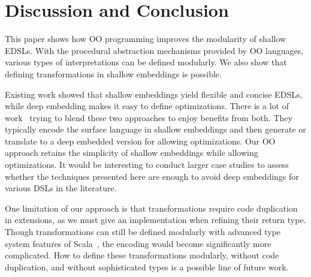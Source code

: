 \section{Discussion and Conclusion}
This paper shows how OO programming improves the modularity of shallow EDSLs.
With the procedural abstraction mechanisms provided by OO languages, various types of
interpretations can be defined modularly. We also show that defining
transformations in shallow embeddings is possible.

Existing work showed that shallow embeddings yield flexible and
concise EDSLs, while deep embedding makes it easy to define
optimizations. There is a lot of work~\cite{svenningsson2012combining,
  Jovanovic:2014:YCD:2658761.2658771, scherr2014implicit} trying to blend these two
approaches to enjoy benefits from both.
They typically encode the surface language in shallow embeddings and
then generate or translate to a deep embedded version for allowing optimizations.
Our OO approach retains the simplicity of shallow embeddings while
allowing optimizations. It would be interesting
to conduct larger case studies to assess whether the techniques
presented here are enough to avoid deep embeddings for various DSLs
in the literature.

One limitation of our approach is that
transformations require code duplication in extensions,
as we must give an implementation when refining their return type.
Though transformations can still be defined modularly with advanced type
system features of Scala~\cite{zenger05independentlyextensible},
the encoding would become significantly more complicated.
How to define these transformations modularly, without code
duplication, and without sophisticated types
is a possible line of future work.  
